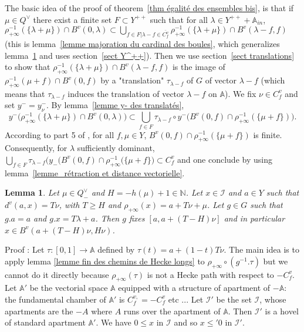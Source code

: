 \documentclass[12pt]{article}
\theoremstyle{plain}
\newtheorem{lemme}[thm]{Lemma}
\theoremstyle{definition}
\newcommand{\A}{\mathbb{A}}
\newcommand{\N}{\mathbb{N}}
\begin{document}
The basic idea of the proof of theorem~\ref{thm égalité des ensembles bis}, is that if $\mu\in Q^\vee$ there exist a finite set $F\subset Y^{++}$ such that for all $\lambda\in Y^{++}+\A_{in}$, $\rho_{+\infty}^{-1}(\{\lambda+\mu\})\cap B^v(0,\lambda) \subset \bigcup_{f\in F|\lambda-f\in\overline{C^v_f}} \rho_{+\infty}^{-1}(\{\lambda+\mu\})\cap B^v(\lambda-f,f)$ (this is lemma~\ref{lemme majoration du cardinal des boules}, which generalizes lemma~\ref{lemme distance finie à l'appartement} and uses section~\ref{sect Y^++}). Then we use section~\ref{sect translations} to show  that $\rho_{+\infty}^{-1}(\{\lambda+\mu\})\cap B^v(\lambda-f,f)$ is the image of $\rho_{+\infty}^{-1}(\mu+f)\cap B^v(0,f)$ by a "translation" $\tau_{\lambda-f}$ of $G$ of vector $\lambda-f$ (which means that $\tau_{\lambda-f}$ induces the translation of vector $\lambda-f$ on $\mathbb{A}$). We fix $\nu\in C_f^v$ and set $y^-=y_\nu^-$. By lemma~\ref{lemme y- des translatés},  \[y^-\big(\rho_{+\infty}^{-1}(\{\lambda+\mu\})\cap B^v(0,\lambda)\big)\subset\bigcup_{f\in F}\tau_{\lambda-f}\circ y^-\big(B^v(0,f)\cap \rho_{+\infty}^{-1}(\{\mu +f\})\big).\] According to part 5 of \cite{gaussent2014spherical}, for all $f, \mu \in Y$, $B^v(0,f)\cap \rho_{+\infty}^{-1}(\{\mu +f\})$ is finite. Consequently, for $\lambda$ sufficiently dominant, $\bigcup_{f\in F}\tau_{\lambda-f}\big(y_-(B^v(0,f)\cap \rho_{+\infty}^{-1}(\{\mu +f\}\big)\subset C^v_f$  and one conclude by using lemma~\ref{lemme_rétraction et distance vectorielle}. 
 



\begin{lemme}\label{lemme distance finie à l'appartement}
Let $\mu\in Q^\vee_-$ and $H=-h(\mu)+1\in \N$. Let $x\in \mathcal{I}$ and $a\in Y$ such that $d^v(a,x)=T\nu$, with $T\geq H$ and $\rho_{+\infty}(x)=a+T\nu +\mu$. Let $g\in G$ such that $g.a=a$ and $g.x=T\lambda+a$. Then $g$ fixes $[a,a+(T-H)\nu]$ and in particular $x\in B^v(a+(T-H)\nu,H\nu)$.
\end{lemme}

Proof : Let $\tau:[0,1]\rightarrow \mathbb{A}$ defined by $\tau(t)=a+(1-t)T\nu$. The main idea is to apply lemma \ref{lemme fin des chemins de Hecke longs} to $\rho_{+\infty}\circ (g^{-1}.\tau)$ but we cannot do it directly because $\rho_{+\infty}(\tau)$ is not a Hecke path with respect to $-C^v_f$. Let $\mathbb{A}'$ be the vectorial space $\mathbb{A}$ equipped with a structure of apartment of $-\mathbb{A}$: the fundamental chamber of $\mathbb{A}'$ is $C^{v,}_f=-C^v_f$ etc ... Let $\mathcal{I}'$ be the set $\mathcal{I}$, whose apartments are the $-A$ where $A$ runs over the apartment of $\mathbb{A}$. Then $\mathcal{I}'$ is a hovel of standard apartment $\mathbb{A}'$. We have $0\leq x$ in $\mathcal{I}$ and so $x\leq'0$ in $\mathcal{I}'$. 
 
\end{document}
